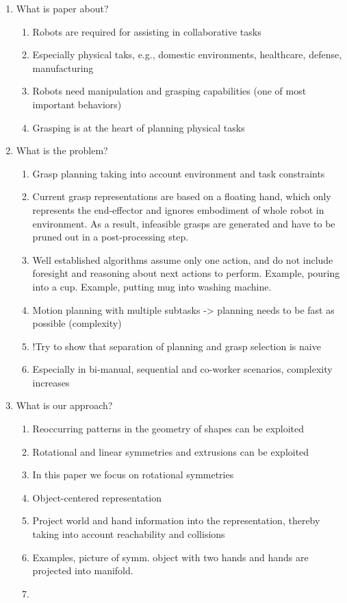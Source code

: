 \documentclass{aamas2015}
\begin{document}
	

\begin{enumerate}
\item What is paper about?
	\begin{enumerate}
	\item Robots are required for assisting in collaborative tasks
	\item Especially physical taks, e.g., domestic environments, healthcare, 
		  defense, manufacturing 
	\item Robots need manipulation and grasping capabilities (one of most 
		  important behaviors)
	\item Grasping is at the heart of planning physical tasks 
	\end{enumerate}

\item What is the problem?
	\begin{enumerate}
	\item Grasp planning taking into account environment and task constraints
	\item Current grasp representations are based on a floating hand, which only 					  represents the end-effector and ignores embodiment of whole robot in
		  environment. As a result, infeasible grasps are generated and have to be
		  pruned out in a post-processing step. 
	\item Well established algorithms assume only one action, and do not include
		  foresight and reasoning about next actions to perform. Example, pouring
		  into a cup. Example, putting mug into washing machine.
	\item Motion planning with multiple subtasks -> planning needs to be fast 
		  as possible (complexity)
	\item !Try to show that separation of planning and grasp selection is naive
	\item Especially in bi-manual, sequential and co-worker scenarios, complexity increases
	\end{enumerate}
	
\item What is our approach?
	\begin{enumerate}
	\item Reoccurring patterns in the geometry of shapes can be exploited
	\item Rotational and linear symmetries and extrusions can be exploited
	\item In this paper we focus on rotational symmetries
	
	\item Object-centered representation
	\item Project world and hand information into the representation, thereby taking
		  into account reachability and collisions
	\item Examples, picture of symm. object with two hands and hands are projected 
		  into manifold.
	\item 
\end{enumerate}

\end{enumerate}
\end{document}
